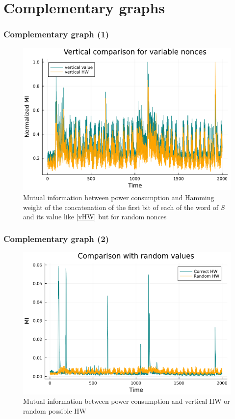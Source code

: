 \documentclass{beamer}
\begin{document}
	\section{Complementary graphs}
	\begin{frame}
		\frametitle{Complementary graph (1)}
		\begin{figure}[H]
			\centering
			\includegraphics[scale=0.3]{img_files/vertical_one_byte}
			\caption{Mutual information between power consumption and Hamming weight of the concatenation of the first bit of each of the word of $S$ and its value like \ref{vHW} but for random nonces}
			\label{vHW&val}
		\end{figure}
	\end{frame}
	
	\begin{frame}
		\frametitle{Complementary graph (2)}
		\begin{figure}[H]
			\centering
			\includegraphics[scale=0.3]{img_files/HWalea}
			\caption{Mutual information between power consumption and vertical HW or random possible HW}
			\label{HWalea}
		\end{figure}
	\end{frame}
	
\end{document}

